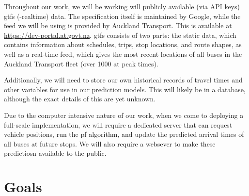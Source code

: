 \documentclass[12pt,a4paper]{article}
\begin{document}









Throughout our work, we will be working will publicly available (via API keys) \gls{gtfs}
(-realtime) data.
The specification itself is maintained by Google, 
while the feed we will be using is provided by Auckland Transport.
This is available at \url{https://dev-portal.at.govt.nz}.
\gls{gtfs} consists of two parts:
the static data, which contains information about schedules, trips, stop locations,
and route shapes, as well as a real-time feed, which gives the most recent locations
of all buses in the Auckland Transport fleet (over 1000 at peak times).


Additionally, we will need to store our own historical records of travel times and other
variables for use in our prediction models. 
This will likely be in a database, although the exact details of this are yet unknown.


Due to the computer intensive nature of our work, 
when we come to deploying a full-scale implementation,
we will require a dedicated server that can request vehicle positions,
run the \gls{pf} algorithm,
and update the predicted arrival times of all buses at future stops.
We will also require a websever to make these predictiosn available to the public.





\section{Goals}




\end{document}
